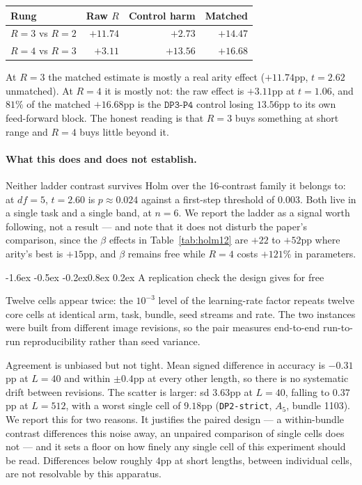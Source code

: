 \documentclass[10pt,twocolumn]{article}
\makeatletter
\renewcommand\subsection{\@startsection{subsection}{2}{\z@}%
  {-1.6ex \@plus -0.5ex \@minus -0.2ex}{0.8ex \@plus 0.2ex}%
  {\normalfont\normalsize\bfseries}}
\newcommand{\hd}[1]{\multicolumn{1}{c}{#1}}
\makeatother
\begin{document}
\begin{center}
\footnotesize
\begin{tabular}{lrrr}
\toprule
Rung & \hd{Raw $R$} & \hd{Control harm} & \hd{Matched} \\
\midrule
$R{=}3$ vs $R{=}2$ & $+11.74$ & $+2.73$ & $+14.47$ \\
$R{=}4$ vs $R{=}3$ & $+3.11$ & $+13.56$ & $+16.68$ \\
\bottomrule
\end{tabular}
\end{center}

At $R{=}3$ the matched estimate is mostly a real arity effect ($+11.74$pp,
$t=2.62$ unmatched). At $R{=}4$ it is mostly not: the raw effect is $+3.11$pp at
$t=1.06$, and $81\%$ of the matched $+16.68$pp is the $\texttt{DP3-P4}$ control
losing $13.56$pp to its own feed-forward block. The honest reading is that
$R{=}3$ buys something at short range and $R{=}4$ buys little beyond it.

\paragraph{What this does and does not establish.} Neither ladder contrast
survives Holm over the 16-contrast family it belongs to: at $df=5$, $t=2.60$ is
$p\approx0.024$ against a first-step threshold of $0.003$. Both live in a single
task and a single band, at $n=6$. We report the ladder as a signal worth
following, not a result --- and note that it does not disturb the paper's
comparison, since the $\beta$ effects in Table~\ref{tab:holm12} are $+22$ to
$+52$pp where arity's best is $+15$pp, and $\beta$ remains free while $R{=}4$
costs $+121\%$ in parameters.

\subsection{A replication check the design gives for free}
\label{sec:replication}

Twelve cells appear twice: the $10^{-3}$ level of the learning-rate factor
repeats twelve core cells at identical arm, task, bundle, seed streams and rate.
The two instances were built from different image revisions, so the pair
measures end-to-end run-to-run reproducibility rather than seed variance.

Agreement is unbiased but not tight. Mean signed difference in accuracy is
$-0.31$pp at $L=40$ and within $\pm0.4$pp at every other length, so there is no
systematic drift between revisions. The scatter is larger: sd $3.63$pp at
$L=40$, falling to $0.37$pp at $L=512$, with a worst single cell of $9.18$pp
(\texttt{DP2-strict}, $A_5$, bundle 1103). We report this for two reasons. It
justifies the paired design --- a within-bundle contrast differences this noise
away, an unpaired comparison of single cells does not --- and it sets a floor on
how finely any single cell of this experiment should be read. Differences below
roughly $4$pp at short lengths, between individual cells, are not resolvable by
this apparatus.
\end{document}
